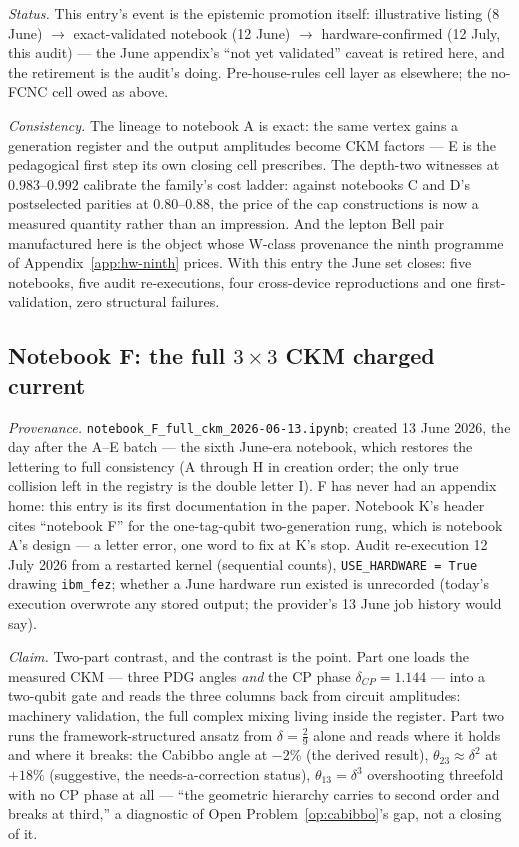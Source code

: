 \emph{Status.} This entry's event is the epistemic promotion itself: illustrative listing
(8 June) $\to$ exact-validated notebook (12 June) $\to$ hardware-confirmed (12 July, this audit)
--- the June appendix's ``not yet validated'' caveat is retired here, and the retirement is the
audit's doing. Pre-house-rules cell layer as elsewhere; the no-FCNC cell owed as above.

\emph{Consistency.} The lineage to notebook A is exact: the same vertex gains a generation
register and the output amplitudes become CKM factors --- E is the pedagogical first step its own
closing cell prescribes. The depth-two witnesses at $0.983$--$0.992$ calibrate the family's cost
ladder: against notebooks C and D's postselected parities at $0.80$--$0.88$, the price of the cap
constructions is now a measured quantity rather than an impression. And the lepton Bell pair
manufactured here is the object whose W-class provenance the ninth programme of
Appendix~\ref{app:hw-ninth} prices. With this entry the June set closes: five notebooks, five
audit re-executions, four cross-device reproductions and one first-validation, zero structural
failures.

\subsection{Notebook F: the full $3\times3$ CKM charged current}
\label{app:nb-F}

\emph{Provenance.} \texttt{notebook\_F\_full\_ckm\_2026-06-13.ipynb}; created 13 June 2026, the
day after the A--E batch --- the sixth June-era notebook, which restores the lettering to full
consistency (A through H in creation order; the only true collision left in the registry is the
double letter I). F has never had an appendix home: this entry is its first documentation in the
paper. Notebook K's header cites ``notebook F'' for the one-tag-qubit two-generation rung, which
is notebook A's design --- a letter error, one word to fix at K's stop. Audit re-execution
12 July 2026 from a restarted kernel (sequential counts), \texttt{USE\_HARDWARE = True} drawing
\texttt{ibm\_fez}; whether a June hardware run existed is unrecorded (today's execution
overwrote any stored output; the provider's 13 June job history would say).

\emph{Claim.} Two-part contrast, and the contrast is the point. Part one loads the measured CKM
--- three PDG angles \emph{and} the CP phase $\delta_{CP} = 1.144$ --- into a two-qubit gate and
reads the three columns back from circuit amplitudes: machinery validation, the full complex
mixing living inside the register. Part two runs the framework-structured ansatz from
$\delta = \tfrac29$ alone and reads where it holds and where it breaks: the Cabibbo angle at
$-2\%$ (the derived result), $\theta_{23} \approx \delta^{2}$ at $+18\%$ (suggestive, the
needs-a-correction status), $\theta_{13} = \delta^{3}$ overshooting threefold with no CP phase at
all --- ``the geometric hierarchy carries to second order and breaks at third,'' a diagnostic of
Open Problem~\ref{op:cabibbo}'s gap, not a closing of it.

